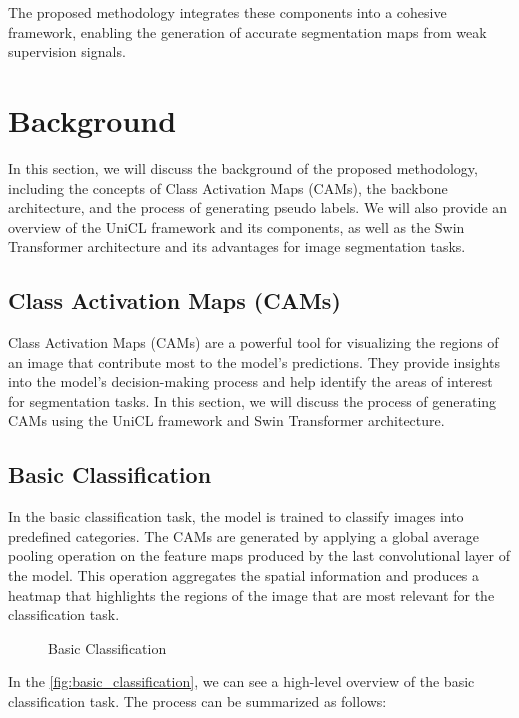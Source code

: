 The proposed methodology integrates these components into a cohesive framework, enabling the generation of accurate segmentation maps from weak supervision signals.

\section{Background}
\label{sec:background}

In this section, we will discuss the background of the proposed methodology, including the concepts of Class Activation Maps (CAMs), the backbone architecture, and the process of generating pseudo labels. We will also provide an overview of the UniCL framework and its components, as well as the Swin Transformer architecture and its advantages for image segmentation tasks.

\subsection{Class Activation Maps (CAMs)}

Class Activation Maps (CAMs) are a powerful tool for visualizing the regions of an image that contribute most to the model's predictions. They provide insights into the model's decision-making process and help identify the areas of interest for segmentation tasks. In this section, we will discuss the process of generating CAMs using the UniCL framework and Swin Transformer architecture.

\subsection{Basic Classification}
\label{subsec:basic_classification}

In the basic classification task, the model is trained to classify images into predefined categories. The CAMs are generated by applying a global average pooling operation on the feature maps produced by the last convolutional layer of the model. This operation aggregates the spatial information and produces a heatmap that highlights the regions of the image that are most relevant for the classification task.

\begin{figure}[htbp]
    \centering
    \caption{Basic Classification}
    \label{fig:basic_classification}
\end{figure}

In the \autoref{fig:basic_classification}, we can see a high-level overview of the basic classification task. The process can be summarized as follows:

